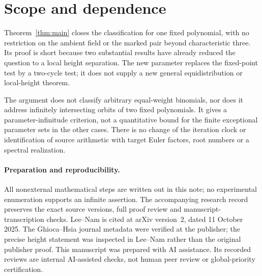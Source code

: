 \section{Scope and dependence}\label{sec:scope}

Theorem~\ref{thm:main} closes the classification for one fixed
polynomial, with no restriction on the ambient field or the marked
pair beyond characteristic three. Its proof is short because two
substantial results have already reduced the question to a local
height separation. The new parameter replaces the fixed-point
test by a two-cycle test; it does not supply a new general
equidistribution or local-height theorem.

The argument does not classify arbitrary equal-weight binomials,
nor does it address infinitely intersecting orbits of two fixed
polynomials. It gives a parameter-infinitude criterion, not a
quantitative bound for the finite exceptional parameter sets in
the other cases. There is no change of the iteration clock or
identification of source arithmetic with target Euler factors,
root numbers or a spectral realization.

\paragraph{Preparation and reproducibility.}
All nonexternal mathematical steps are written out in this note;
no experimental enumeration supports an infinite assertion.
The accompanying research record preserves the exact source
versions, full proof review and manuscript-transcription checks.
Lee--Nam is cited at arXiv version~2, dated 11 October 2025.
The Ghioca--Hsia journal metadata were verified at the publisher;
the precise height statement was inspected in Lee--Nam rather
than the original publisher proof. This manuscript was prepared
with AI assistance. Its recorded reviews are internal AI-assisted
checks, not human peer review or global-priority certification.
